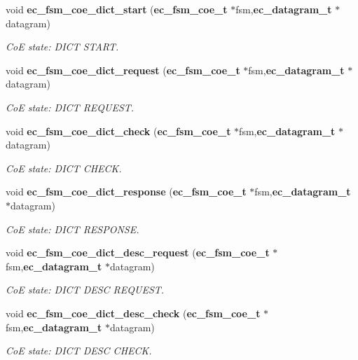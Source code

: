 \begin{DoxyCompactItemize}
\item 
void {\bf ec\-\_\-fsm\-\_\-coe\-\_\-dict\-\_\-start} ({\bf ec\-\_\-fsm\-\_\-coe\-\_\-t} $\ast$fsm,{\bf ec\-\_\-datagram\-\_\-t} $\ast$datagram)
\begin{DoxyCompactList}\small\item\em \-Co\-E state\-: \-D\-I\-C\-T \-S\-T\-A\-R\-T. \end{DoxyCompactList}\item 
void {\bf ec\-\_\-fsm\-\_\-coe\-\_\-dict\-\_\-request} ({\bf ec\-\_\-fsm\-\_\-coe\-\_\-t} $\ast$fsm,{\bf ec\-\_\-datagram\-\_\-t} $\ast$datagram)
\begin{DoxyCompactList}\small\item\em \-Co\-E state\-: \-D\-I\-C\-T \-R\-E\-Q\-U\-E\-S\-T. \end{DoxyCompactList}\item 
void {\bf ec\-\_\-fsm\-\_\-coe\-\_\-dict\-\_\-check} ({\bf ec\-\_\-fsm\-\_\-coe\-\_\-t} $\ast$fsm,{\bf ec\-\_\-datagram\-\_\-t} $\ast$datagram)
\begin{DoxyCompactList}\small\item\em \-Co\-E state\-: \-D\-I\-C\-T \-C\-H\-E\-C\-K. \end{DoxyCompactList}\item 
void {\bf ec\-\_\-fsm\-\_\-coe\-\_\-dict\-\_\-response} ({\bf ec\-\_\-fsm\-\_\-coe\-\_\-t} $\ast$fsm,{\bf ec\-\_\-datagram\-\_\-t} $\ast$datagram)
\begin{DoxyCompactList}\small\item\em \-Co\-E state\-: \-D\-I\-C\-T \-R\-E\-S\-P\-O\-N\-S\-E. \end{DoxyCompactList}\item 
void {\bf ec\-\_\-fsm\-\_\-coe\-\_\-dict\-\_\-desc\-\_\-request} ({\bf ec\-\_\-fsm\-\_\-coe\-\_\-t} $\ast$fsm,{\bf ec\-\_\-datagram\-\_\-t} $\ast$datagram)
\begin{DoxyCompactList}\small\item\em \-Co\-E state\-: \-D\-I\-C\-T \-D\-E\-S\-C \-R\-E\-Q\-U\-E\-S\-T. \end{DoxyCompactList}\item 
void {\bf ec\-\_\-fsm\-\_\-coe\-\_\-dict\-\_\-desc\-\_\-check} ({\bf ec\-\_\-fsm\-\_\-coe\-\_\-t} $\ast$fsm,{\bf ec\-\_\-datagram\-\_\-t} $\ast$datagram)
\begin{DoxyCompactList}\small\item\em \-Co\-E state\-: \-D\-I\-C\-T \-D\-E\-S\-C \-C\-H\-E\-C\-K. \end{DoxyCompactList}\item 

\end{DoxyCompactItemize}

